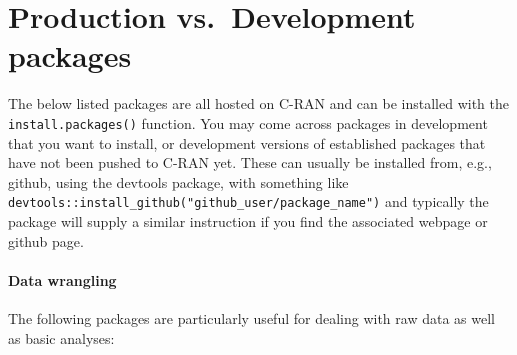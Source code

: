 \documentclass[
  letterpaper,
  DIV=11,
  numbers=noendperiod]{scrreprt}
\begin{document}
\begin{tcolorbox}[enhanced jigsaw, colframe=quarto-callout-note-color-frame, opacityback=0, leftrule=.75mm, bottomrule=.15mm, rightrule=.15mm, left=2mm, toptitle=1mm, colback=white, bottomtitle=1mm, titlerule=0mm, title=\textcolor{quarto-callout-note-color}{\faInfo}\hspace{0.5em}{Note}, arc=.35mm, toprule=.15mm, breakable, coltitle=black, colbacktitle=quarto-callout-note-color!10!white, opacitybacktitle=0.6]


\hypertarget{production-vs.-development-packages}{%
\chapter{Production vs.~Development
packages}\label{production-vs.-development-packages}}

The below listed packages are all hosted on C-RAN and can be installed
with the \texttt{install.packages()} function. You may come across
packages in development that you want to install, or development
versions of established packages that have not been pushed to C-RAN yet.
These can usually be installed from, e.g., github, using the devtools
package, with something like
\texttt{devtools::install\_github("github\_user/package\_name")} and
typically the package will supply a similar instruction if you find the
associated webpage or github page.

\end{tcolorbox}

\hypertarget{data-wrangling}{%
\subsubsection*{Data wrangling}\label{data-wrangling}}

The following packages are particularly useful for dealing with raw data
as well as basic analyses:
\end{document}
